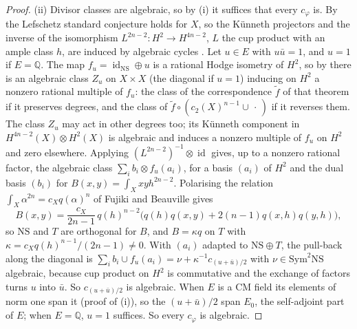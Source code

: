 \documentclass[11pt,reqno]{amsart}
\theoremstyle{plain}
\theoremstyle{definition}
\theoremstyle{remark}
\newcommand{\QQ}{\mathbb{Q}}
\newcommand{\NS}{\mathrm{NS}}
\DeclareMathOperator{\id}{id}
\begin{document}
\begin{proof}
(ii) Divisor classes are algebraic, so by (i) it suffices that every
$c_{\varphi}$ is. By \cite[Theorem~1.1]{CM13} the Lefschetz standard
conjecture holds for $X$, so the K\"unneth projectors and the inverse of the isomorphism
$L^{2n-2}\colon H^{2}\to H^{4n-2}$, $L$ the cup product with an ample class
$h$, are induced by algebraic cycles \cite{Kle68,Kle94}. Let $u\in E$ with
$u\bar u=1$, and $u=1$ if $E=\QQ$. The map $f_{u}=\id_{\NS}\oplus u$ is a
rational Hodge isometry of $H^{2}$, so by \cite[Theorem~1.1]{Mar24} there is
an algebraic class $Z_{u}$ on $X\times X$ (the diagonal if $u=1$) inducing on
$H^{2}$ a nonzero rational multiple of $f_{u}$: the class of the
correspondence $\tilde f$ of that theorem if it preserves degrees, and the
class of $\tilde f\circ(c_{2}(X)^{n-1}\cup\,\cdot\,)$ if it reverses them.
The class $Z_{u}$ may act in other degrees too; its K\"unneth component in
$H^{4n-2}(X)\otimes H^{2}(X)$ is algebraic and induces a nonzero multiple of
$f_{u}$ on $H^{2}$ and zero elsewhere. Applying $(L^{2n-2})^{-1}\otimes\id$
gives, up to a nonzero rational factor, the algebraic class
$\sum_{i}b_{i}\otimes f_{u}(a_{i})$, for a basis $(a_{i})$ of $H^{2}$ and
the dual basis $(b_{i})$ for $B(x,y)=\int_{X}xyh^{2n-2}$. Polarising the
relation $\int_{X}\alpha^{2n}=c_{X}q(\alpha)^{n}$ of Fujiki and Beauville
\cite{Bea83,Fuj87} gives
\[
  B(x,y)=\frac{c_{X}}{2n-1}\,q(h)^{n-2}\bigl(q(h)q(x,y)+2(n-1)q(x,h)q(y,h)\bigr),
\]
so $\NS$ and $T$ are orthogonal for $B$, and $B=\kappa q$ on $T$ with
$\kappa=c_{X}q(h)^{n-1}/(2n-1)\ne0$. With $(a_{i})$ adapted to
$\NS\oplus T$, the pull-back along the diagonal is
$\sum_{i}b_{i}\cup f_{u}(a_{i})=\nu+\kappa^{-1}c_{(u+\bar u)/2}$ with
$\nu\in\mathrm{Sym}^{2}\NS$ algebraic, because cup product on $H^{2}$ is
commutative and the exchange of factors turns $u$ into $\bar u$. So
$c_{(u+\bar u)/2}$ is algebraic. When $E$ is a CM field its elements of norm
one span it (proof of (i)), so the $(u+\bar u)/2$ span
$E_{0}$, the self-adjoint part of $E$; when $E=\QQ$, $u=1$ suffices. So
every $c_{\varphi}$ is algebraic.


\end{proof}
\end{document}
